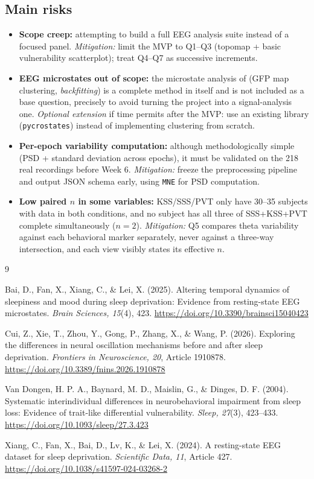 \documentclass[10pt]{article}
\begin{document}
\subsection*{Main risks}
\begin{itemize}
    \item \textbf{Scope creep:} attempting to build a full EEG analysis suite instead of a focused panel. \emph{Mitigation:} limit the MVP to Q1--Q3 (topomap + basic vulnerability scatterplot); treat Q4--Q7 as successive increments.
    \item \textbf{EEG microstates out of scope:} the microstate analysis of \citet{bai2025} (GFP map clustering, \emph{backfitting}) is a complete method in itself and is not included as a base question, precisely to avoid turning the project into a signal-analysis one. \emph{Optional extension} if time permits after the MVP: use an existing library (\texttt{pycrostates}) instead of implementing clustering from scratch.
    \item \textbf{Per-epoch variability computation:} although methodologically simple (PSD + standard deviation across epochs), it must be validated on the 218 real recordings before Week 6. \emph{Mitigation:} freeze the preprocessing pipeline and output JSON schema early, using \texttt{MNE} for PSD computation.
    \item \textbf{Low paired $n$ in some variables:} KSS/SSS/PVT only have 30--35 subjects with data in both conditions, and no subject has all three of SSS+KSS+PVT complete simultaneously ($n=2$). \emph{Mitigation:} Q5 compares theta variability against each behavioral marker separately, never against a three-way intersection, and each view visibly states its effective $n$.
\end{itemize}

{\footnotesize
\begin{thebibliography}{9}
\setlength{\itemsep}{1pt}

Bai, D., Fan, X., Xiang, C., \& Lei, X. (2025). Altering temporal dynamics of sleepiness and mood during sleep deprivation: Evidence from resting-state EEG microstates. \emph{Brain Sciences, 15}(4), 423. \url{https://doi.org/10.3390/brainsci15040423}

Cui, Z., Xie, T., Zhou, Y., Gong, P., Zhang, X., \& Wang, P. (2026). Exploring the differences in neural oscillation mechanisms before and after sleep deprivation. \emph{Frontiers in Neuroscience, 20}, Article 1910878. \url{https://doi.org/10.3389/fnins.2026.1910878}

Van Dongen, H. P. A., Baynard, M. D., Maislin, G., \& Dinges, D. F. (2004). Systematic interindividual differences in neurobehavioral impairment from sleep loss: Evidence of trait-like differential vulnerability. \emph{Sleep, 27}(3), 423--433. \url{https://doi.org/10.1093/sleep/27.3.423}

Xiang, C., Fan, X., Bai, D., Lv, K., \& Lei, X. (2024). A resting-state EEG dataset for sleep deprivation. \emph{Scientific Data, 11}, Article 427. \url{https://doi.org/10.1038/s41597-024-03268-2}

\end{thebibliography}
}
\end{document}
